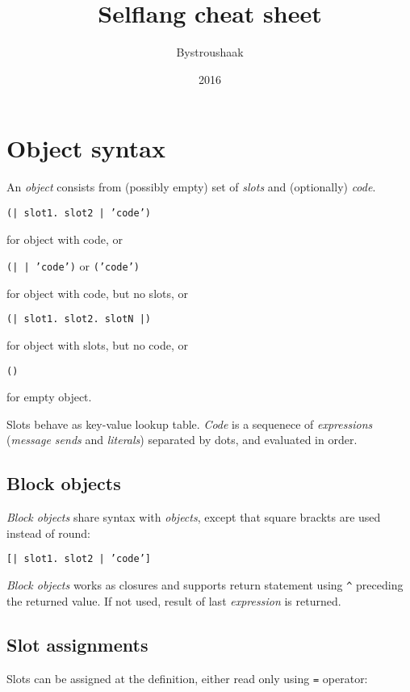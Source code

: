 \documentclass[10pt]{article}
\title{Selflang cheat sheet}
\author{Bystroushaak}
\date{2016}
\renewcommand{\maketitle}{
    {\begin{center}\Large \mythetitle\end{center}}
}
\begin{document}
\begin{multicols*}{3}
\maketitle

\section{Object syntax}
An \textit{object} consists from (possibly empty) set of \textit{slots} and (optionally) \textit{code}.

\vspace*{0.2cm}
\texttt{(| slot1. slot2 | 'code')}

for object with code, or

\texttt{(| | 'code')} or \texttt{('code')}

for object with code, but no slots, or

\texttt{(| slot1. slot2. slotN |)}

for object with slots, but no code, or

\texttt{()}

for empty object.
\vspace*{0.2cm}

Slots behave as key-value lookup table. \textit{Code} is a sequenece of \textit{expressions} (\textit{message sends} and \textit{literals}) separated by dots, and evaluated in order.

\subsection{Block objects}
\textit{Block objects} share syntax with \textit{objects}, except that square brackts are used instead of round:

\vspace*{0.2cm}
\texttt{[| slot1. slot2 | 'code']}
\vspace*{0.2cm}

\textit{Block objects} works as closures and supports return statement using \texttt{\^} preceding the returned value. If not used, result of last \textit{expression} is returned.


\subsection{Slot assignments}
Slots can be assigned at the definition, either read only using \texttt{=} operator:


\end{multicols*}
\end{document}
